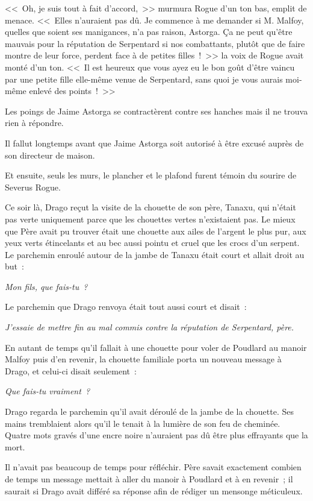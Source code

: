 <<~Oh, je suis tout à fait d'accord,~>> murmura Rogue d'un ton bas, emplit de menace. <<~Elles n'auraient pas dû. Je commence à me demander si M. Malfoy, quelles que soient ses manigances, n'a pas raison, Astorga. Ça ne peut qu'être mauvais pour la réputation de Serpentard si nos combattants, plutôt que de faire montre de leur force, perdent face à de petites filles~!~>> la voix de Rogue avait monté d'un ton. <<~Il est heureux que vous ayez eu le bon goût d'être vaincu par une petite fille elle-même venue de Serpentard, sans quoi je vous aurais moi-même enlevé des points~!~>>

Les poings de Jaime Astorga se contractèrent contre ses hanches mais il ne trouva rien à répondre.

Il fallut longtemps avant que Jaime Astorga soit autorisé à être excusé auprès de son directeur de maison.

Et ensuite, seuls les murs, le plancher et le plafond furent témoin du sourire de Severus Rogue.

\later

Ce soir là, Drago reçut la visite de la chouette de son père, Tanaxu, qui n'était pas verte uniquement parce que les chouettes vertes n'existaient pas. Le mieux que Père avait pu trouver était une chouette aux ailes de l'argent le plus pur, aux yeux verts étincelants et au bec aussi pointu et cruel que les crocs d'un serpent. Le parchemin enroulé autour de la jambe de Tanaxu était court et allait droit au but~:

\emph{Mon fils, que fais-tu~?}

Le parchemin que Drago renvoya était tout aussi court et disait~:

\emph{J'essaie de mettre fin au mal commis contre la réputation de Serpentard, père.}

En autant de temps qu'il fallait à une chouette pour voler de Poudlard au manoir Malfoy puis d'en revenir, la chouette familiale porta un nouveau message à Drago, et celui-ci disait seulement~:

\emph{Que fais-tu vraiment~?}

Drago regarda le parchemin qu'il avait déroulé de la jambe de la chouette. Ses mains tremblaient alors qu'il le tenait à la lumière de son feu de cheminée. Quatre mots gravés d'une encre noire n'auraient pas dû être plus effrayants que la mort.

Il n'avait pas beaucoup de temps pour réfléchir. Père savait exactement combien de temps un message mettait à aller du manoir à Poudlard et à en revenir~; il saurait si Drago avait différé sa réponse afin de rédiger un mensonge méticuleux.


